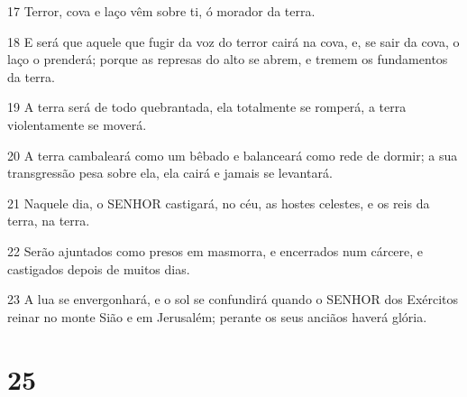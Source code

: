 \par 17 Terror, cova e laço vêm sobre ti, ó morador da terra.
\par 18 E será que aquele que fugir da voz do terror cairá na cova, e, se sair da cova, o laço o prenderá; porque as represas do alto se abrem, e tremem os fundamentos da terra.
\par 19 A terra será de todo quebrantada, ela totalmente se romperá, a terra violentamente se moverá.
\par 20 A terra cambaleará como um bêbado e balanceará como rede de dormir; a sua transgressão pesa sobre ela, ela cairá e jamais se levantará.
\par 21 Naquele dia, o SENHOR castigará, no céu, as hostes celestes, e os reis da terra, na terra.
\par 22 Serão ajuntados como presos em masmorra, e encerrados num cárcere, e castigados depois de muitos dias.
\par 23 A lua se envergonhará, e o sol se confundirá quando o SENHOR dos Exércitos reinar no monte Sião e em Jerusalém; perante os seus anciãos haverá glória.

\chapter{25}

